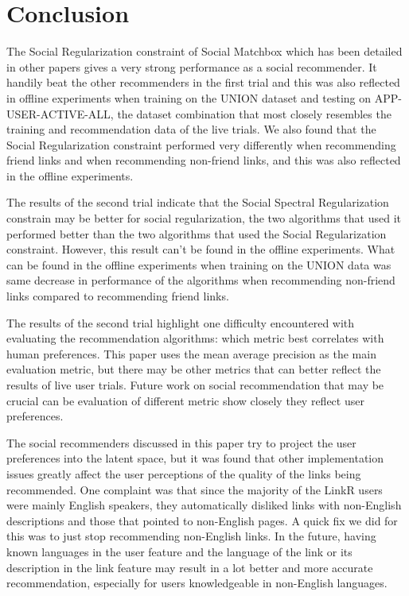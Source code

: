 
\chapter{Conclusion}

The Social Regularization constraint of Social Matchbox which has been detailed in other papers gives a very strong performance as a social recommender. It handily beat the other recommenders in the first trial and this was also reflected in offline experiments when training on the UNION dataset and testing on APP-USER-ACTIVE-ALL, the dataset combination that most closely resembles the training and recommendation data of the live trials. We also found that the Social Regularization constraint performed very differently when recommending friend links and when recommending non-friend links, and this was also reflected in the offline experiments. 

The results of the second trial indicate that the Social Spectral Regularization constrain may be better for social regularization, the two algorithms that used it performed better than the two algorithms that used the Social Regularization constraint. However, this result can't be found in the offline experiments. What can be found in the offline experiments when training on the UNION data was same decrease in performance of the algorithms when recommending non-friend links compared to recommending friend links.

The results of the second trial highlight one difficulty encountered with evaluating the recommendation algorithms: which metric best correlates with human preferences. This paper uses the mean average precision as the main evaluation metric, but there may be other metrics that can better reflect the results of live user trials. Future work on social recommendation that may be crucial can be evaluation of different metric show closely they reflect user preferences.

The social recommenders discussed in this paper try to project the user preferences into the latent space, but it was found that other implementation issues greatly affect the user perceptions of the quality of the links being recommended. One complaint was that since the majority of the LinkR users were mainly English speakers, they automatically disliked links with non-English descriptions and those that pointed to non-English pages. A quick fix we did for this was to just stop recommending non-English links. In the future, having known languages in the user feature and the language of the link or its description in the link feature may result in a lot better and more accurate recommendation, especially for users knowledgeable in non-English languages.

